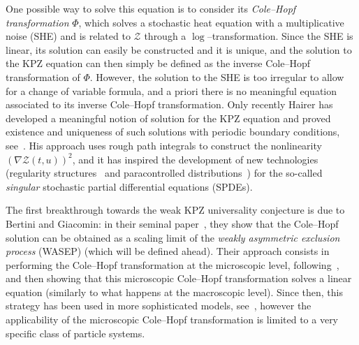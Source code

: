 \documentclass[AHL,Unicode,longabstracts]{cedram}
\newcommand{\mc}[1]{{\mathcal #1}}
\renewcommand{\mc}[1]{{\mathcal #1}}
\begin{document}
One possible way to solve this equation is to consider its \emph{Cole--Hopf transformation} $\Phi$, which solves a stochastic heat equation with a multiplicative noise (SHE) and is related to $\mc Z$ through a $\log$--transformation. Since the SHE is linear, its solution can easily be constructed and it is unique, and the solution to the KPZ equation can then simply be defined as the inverse Cole--Hopf transformation of $\Phi$. However, the solution to the SHE is too irregular to allow for a change of variable formula, and a priori there is no meaningful equation associated to its inverse Cole--Hopf transformation. Only recently Hairer has developed a meaningful notion of solution for the KPZ equation and proved existence and uniqueness of such solutions with periodic boundary conditions, see~\cite{Hairer2013}. His approach uses rough path integrals to construct the nonlinearity $(\nabla \mc Z(t,u))^2$, and it has inspired the development of new technologies (regularity structures~\cite{Hairer2014} and paracontrolled distributions~\cite{Gubinelli2015Paracontrolled}) for the so-called \emph{singular} stochastic partial differential equations (SPDEs).

The first breakthrough towards the weak KPZ universality conjecture is due to Bertini and Giacomin: in their seminal paper~\cite{BerG}, they show that the Cole--Hopf solution can be obtained as a scaling limit of the \emph{weakly asymmetric exclusion process} (WASEP) (which will be defined ahead). Their approach consists in performing the Cole--Hopf transformation at the microscopic level, following~\cite{GAR}, and then showing that this microscopic Cole--Hopf transformation solves a linear equation (similarly to what happens at the macroscopic level). Since then, this strategy has been used in more sophisticated models, see~\cite{Corwin2016,CST,corwin2017,Dembo2016}, however the applicability of the microscopic Cole--Hopf transformation is limited to a very specific class of particle systems.
\end{document}
